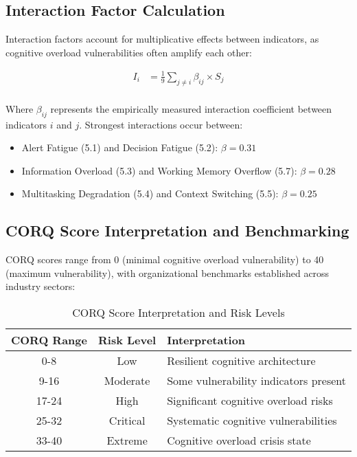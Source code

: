 \documentclass[11pt,a4paper]{article}
\begin{document}
\subsection{Interaction Factor Calculation}

Interaction factors account for multiplicative effects between indicators, as cognitive overload vulnerabilities often amplify each other:

\begin{align}
I_i &= \frac{1}{9} \sum_{j \neq i} \beta_{ij} \times S_j \\
\end{align}

Where $\beta_{ij}$ represents the empirically measured interaction coefficient between indicators $i$ and $j$. Strongest interactions occur between:
\begin{itemize}
\item Alert Fatigue (5.1) and Decision Fatigue (5.2): $\beta = 0.31$
\item Information Overload (5.3) and Working Memory Overflow (5.7): $\beta = 0.28$
\item Multitasking Degradation (5.4) and Context Switching (5.5): $\beta = 0.25$
\end{itemize}

\subsection{CORQ Score Interpretation and Benchmarking}

CORQ scores range from 0 (minimal cognitive overload vulnerability) to 40 (maximum vulnerability), with organizational benchmarks established across industry sectors:

\begin{table}[H]
\centering
\caption{CORQ Score Interpretation and Risk Levels}
\label{tab:corq_interpretation}
\begin{tabular}{ccl}
\toprule
CORQ Range & Risk Level & Interpretation \\
\midrule
0-8 & Low & Resilient cognitive architecture \\
9-16 & Moderate & Some vulnerability indicators present \\
17-24 & High & Significant cognitive overload risks \\
25-32 & Critical & Systematic cognitive vulnerabilities \\
33-40 & Extreme & Cognitive overload crisis state \\
\bottomrule
\end{tabular}
\end{table}
\end{document}
